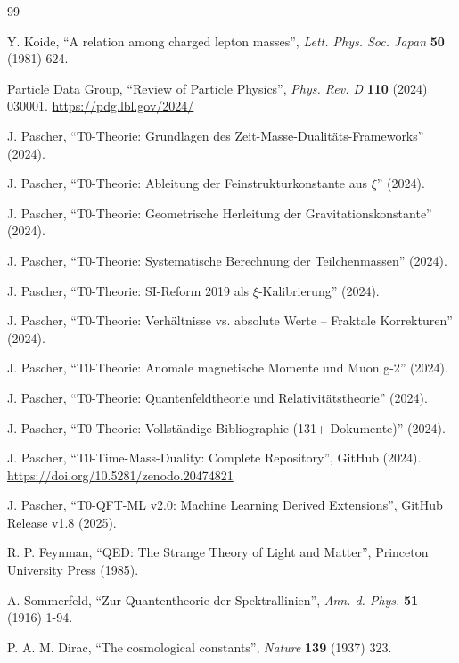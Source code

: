 	\begin{thebibliography}{99}
		
		Y. Koide, ``A relation among charged lepton masses'', \textit{Lett. Phys. Soc. Japan} \textbf{50} (1981) 624.
		
		Particle Data Group, ``Review of Particle Physics'', \textit{Phys. Rev. D} \textbf{110} (2024) 030001. 
		\url{https://pdg.lbl.gov/2024/}
		
		J. Pascher, ``T0-Theorie: Grundlagen des Zeit-Masse-Dualitäts-Frameworks'' (2024).
		
		J. Pascher, ``T0-Theorie: Ableitung der Feinstrukturkonstante aus $\xi$'' (2024).
		
		J. Pascher, ``T0-Theorie: Geometrische Herleitung der Gravitationskonstante'' (2024).
		
		J. Pascher, ``T0-Theorie: Systematische Berechnung der Teilchenmassen'' (2024).
		
		J. Pascher, ``T0-Theorie: SI-Reform 2019 als $\xi$-Kalibrierung'' (2024).
		
		J. Pascher, ``T0-Theorie: Verhältnisse vs. absolute Werte -- Fraktale Korrekturen'' (2024).
		
		J. Pascher, ``T0-Theorie: Anomale magnetische Momente und Muon g-2'' (2024).
		
		J. Pascher, ``T0-Theorie: Quantenfeldtheorie und Relativitätstheorie'' (2024).
		
		J. Pascher, ``T0-Theorie: Vollständige Bibliographie (131+ Dokumente)'' (2024).
		
		J. Pascher, ``T0-Time-Mass-Duality: Complete Repository'', GitHub (2024). 
		\url{https://doi.org/10.5281/zenodo.20474821}
		
		J. Pascher, ``T0-QFT-ML v2.0: Machine Learning Derived Extensions'', GitHub Release v1.8 (2025).
		
		R. P. Feynman, ``QED: The Strange Theory of Light and Matter'', Princeton University Press (1985).
		
		A. Sommerfeld, ``Zur Quantentheorie der Spektrallinien'', \textit{Ann. d. Phys.} \textbf{51} (1916) 1-94.
		
		P. A. M. Dirac, ``The cosmological constants'', \textit{Nature} \textbf{139} (1937) 323.
		

\end{thebibliography}
